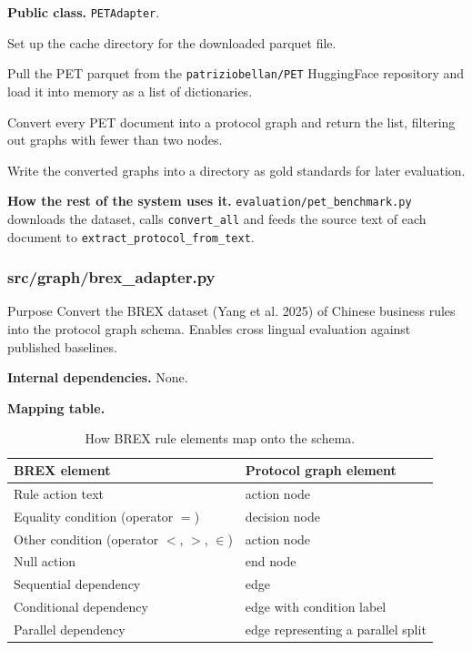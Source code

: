 \documentclass{article}
\begin{document}
\textbf{Public class.} \texttt{PETAdapter}.

\begin{description}[leftmargin=2em, style=nextline]
\item[\texttt{\_\_init\_\_(cache\_dir=".cache/pet")}]
Set up the cache directory for the downloaded parquet file.
\item[\texttt{download()}]
Pull the PET parquet from the
\texttt{patriziobellan/PET} HuggingFace repository and load it into
memory as a list of dictionaries.
\item[\texttt{convert\_all()}]
Convert every PET document into a protocol graph and return the list,
filtering out graphs with fewer than two nodes.
\item[\texttt{save\_as\_gold(output\_dir, protocols)}]
Write the converted graphs into a directory as gold standards for
later evaluation.
\end{description}

\textbf{How the rest of the system uses it.}
\texttt{evaluation/pet\_benchmark.py} downloads the dataset, calls
\texttt{convert\_all} and feeds the source text of each document to
\texttt{extract\_protocol\_from\_text}.

\subsubsection{src/graph/brex\_adapter.py}

\begin{codeconceptbox}{Purpose}
Convert the BREX dataset (Yang et al. 2025) of Chinese business rules
into the protocol graph schema. Enables cross lingual evaluation
against published baselines.
\end{codeconceptbox}

\textbf{Internal dependencies.} None.

\textbf{Mapping table.}

\begin{table}[H]
\centering
\begin{tabularx}{\textwidth}{l X}
\toprule
\textbf{BREX element} & \textbf{Protocol graph element} \\
\midrule
Rule action text                       & action node \\
Equality condition (operator $=$)      & decision node \\
Other condition (operator $<$, $>$, $\in$) & action node \\
Null action                            & end node \\
Sequential dependency                  & edge \\
Conditional dependency                 & edge with condition label \\
Parallel dependency                    & edge representing a parallel split \\
\bottomrule
\end{tabularx}
\caption{How BREX rule elements map onto the schema.}
\end{table}
\end{document}
